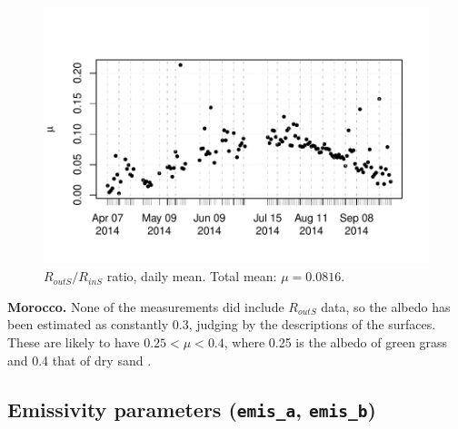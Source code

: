 \documentclass{scrreprt}
\begin{document}
\begin{figure}[ht]
  \centering
  \includegraphics[width=0.6\hsize]{./plot_alb.pdf}
  \caption{$R_{outS}/R_{inS}$ ratio, daily mean. Total mean: $\mu = 0.0816$.}
  \label{fig:portugal_alb}
\end{figure}

\textbf{Morocco.}
None of the measurements did include $R_{outS}$ data, so the albedo has been estimated as constantly 0.3, judging by the descriptions of the surfaces.
These are likely to have $0.25 < \mu < 0.4$, where 0.25 is the albedo of green grass \citep{markvart03} and 0.4 that of dry sand \citep{tetzlaff83}.

\subsection{Emissivity parameters (\texttt{emis\_a}, \texttt{emis\_b})} \label{ssec:parest_rad_emis}
\end{document}
